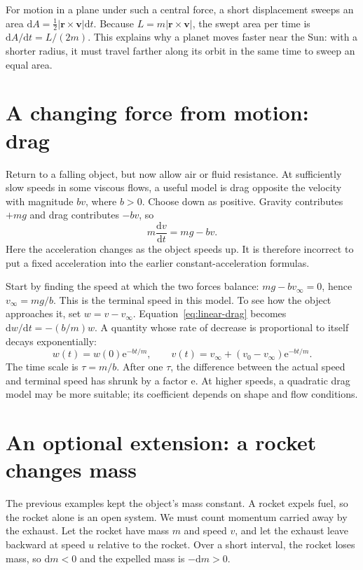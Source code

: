 \documentclass[11pt,oneside]{book}
\newcommand{\dd}{\mathrm{d}}
\newcommand{\ee}{\mathrm{e}}
\newcommand{\vect}[1]{\boldsymbol{#1}}
\newcommand{\od}[2]{\frac{\dd #1}{\dd #2}}
\theoremstyle{reviewstyle}
\begin{document}
For motion in a plane under such a central force, a short displacement sweeps an area $\dd A=\tfrac12|\vect r\times\vect v|\dd t$. Because $L=m|\vect r\times\vect v|$, the swept area per time is $\dd A/\dd t=L/(2m)$. This explains why a planet moves faster near the Sun: with a shorter radius, it must travel farther along its orbit in the same time to sweep an equal area.

\section{A changing force from motion: drag}
Return to a falling object, but now allow air or fluid resistance. At sufficiently slow speeds in some viscous flows, a useful model is drag opposite the velocity with magnitude $bv$, where $b>0$. Choose down as positive. Gravity contributes $+mg$ and drag contributes $-bv$, so
\begin{equation}
m\od{v}{t}=mg-bv.
\label{eq:linear-drag}
\end{equation}
Here the acceleration changes as the object speeds up. It is therefore incorrect to put a fixed acceleration into the earlier constant-acceleration formulas.

Start by finding the speed at which the two forces balance: $mg-bv_\infty=0$, hence $v_\infty=mg/b$. This is the terminal speed in this model. To see how the object approaches it, set $w=v-v_\infty$. Equation~\eqref{eq:linear-drag} becomes $\dd w/\dd t=-(b/m)w$. A quantity whose rate of decrease is proportional to itself decays exponentially:
\begin{equation}
w(t)=w(0)\ee^{-bt/m},\qquad
v(t)=v_\infty+(v_0-v_\infty)\ee^{-bt/m}.
\end{equation}
The time scale is $\tau=m/b$. After one $\tau$, the difference between the actual speed and terminal speed has shrunk by a factor $\ee$. At higher speeds, a quadratic drag model may be more suitable; its coefficient depends on shape and flow conditions.

\section{An optional extension: a rocket changes mass}
The previous examples kept the object's mass constant. A rocket expels fuel, so the rocket alone is an open system. We must count momentum carried away by the exhaust. Let the rocket have mass $m$ and speed $v$, and let the exhaust leave backward at speed $u$ relative to the rocket. Over a short interval, the rocket loses mass, so $\dd m<0$ and the expelled mass is $-\dd m>0$.
\end{document}
